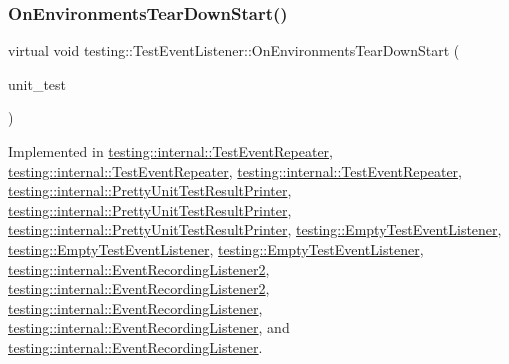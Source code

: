 \subsubsection{\texorpdfstring{OnEnvironmentsTearDownStart()}{OnEnvironmentsTearDownStart()}\hspace{0.1cm}{\footnotesize\ttfamily [3/3]}}
{\footnotesize\ttfamily virtual void testing\+::\+Test\+Event\+Listener\+::\+On\+Environments\+Tear\+Down\+Start (\begin{DoxyParamCaption}\item[{const \mbox{\hyperlink{classtesting_1_1_unit_test}{Unit\+Test}} \&}]{unit\+\_\+test }\end{DoxyParamCaption})\hspace{0.3cm}{\ttfamily [pure virtual]}}



Implemented in \mbox{\hyperlink{classtesting_1_1internal_1_1_test_event_repeater_aa2bf25212c9b1c09ed80b2bbcf55dbba}{testing\+::internal\+::\+Test\+Event\+Repeater}}, \mbox{\hyperlink{classtesting_1_1internal_1_1_test_event_repeater_aa2bf25212c9b1c09ed80b2bbcf55dbba}{testing\+::internal\+::\+Test\+Event\+Repeater}}, \mbox{\hyperlink{classtesting_1_1internal_1_1_test_event_repeater_a30db75df2d9a65d787f31e16004613c2}{testing\+::internal\+::\+Test\+Event\+Repeater}}, \mbox{\hyperlink{classtesting_1_1internal_1_1_pretty_unit_test_result_printer_a97efe483cbb1c55d32bdc7a997a99f13}{testing\+::internal\+::\+Pretty\+Unit\+Test\+Result\+Printer}}, \mbox{\hyperlink{classtesting_1_1internal_1_1_pretty_unit_test_result_printer_a97efe483cbb1c55d32bdc7a997a99f13}{testing\+::internal\+::\+Pretty\+Unit\+Test\+Result\+Printer}}, \mbox{\hyperlink{classtesting_1_1internal_1_1_pretty_unit_test_result_printer_a30703edd3f8a434035a4977eeb49918d}{testing\+::internal\+::\+Pretty\+Unit\+Test\+Result\+Printer}}, \mbox{\hyperlink{classtesting_1_1_empty_test_event_listener_a320780451eac9178434b7c77d948ecbd}{testing\+::\+Empty\+Test\+Event\+Listener}}, \mbox{\hyperlink{classtesting_1_1_empty_test_event_listener_a320780451eac9178434b7c77d948ecbd}{testing\+::\+Empty\+Test\+Event\+Listener}}, \mbox{\hyperlink{classtesting_1_1_empty_test_event_listener_a00fa1a4ea5831e20746188414268e7c6}{testing\+::\+Empty\+Test\+Event\+Listener}}, \mbox{\hyperlink{classtesting_1_1internal_1_1_event_recording_listener2_a9b29ac6408f671e6b0fcafba75238573}{testing\+::internal\+::\+Event\+Recording\+Listener2}}, \mbox{\hyperlink{classtesting_1_1internal_1_1_event_recording_listener2_a9b29ac6408f671e6b0fcafba75238573}{testing\+::internal\+::\+Event\+Recording\+Listener2}}, \mbox{\hyperlink{classtesting_1_1internal_1_1_event_recording_listener_aab8379a206927984cdb7b84399a122a5}{testing\+::internal\+::\+Event\+Recording\+Listener}}, \mbox{\hyperlink{classtesting_1_1internal_1_1_event_recording_listener_aab8379a206927984cdb7b84399a122a5}{testing\+::internal\+::\+Event\+Recording\+Listener}}, and \mbox{\hyperlink{classtesting_1_1internal_1_1_event_recording_listener_a17eebd7bb5cc6bab53b20794919ca5ae}{testing\+::internal\+::\+Event\+Recording\+Listener}}.

